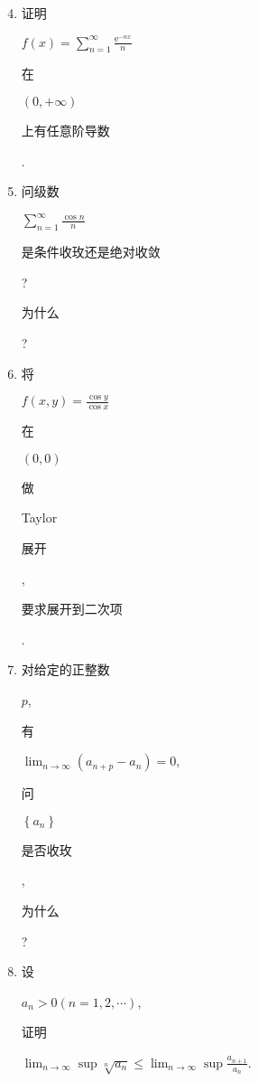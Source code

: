 \documentclass[10pt]{article}
\begin{document}
\begin{enumerate}
  \setcounter{enumi}{3}
  \item \begin{CJK}{UTF8}{mj}证明\end{CJK} $f(x)=\sum_{n=1}^{\infty} \frac{\mathrm{e}^{-n x}}{n}$ \begin{CJK}{UTF8}{mj}在\end{CJK} $(0,+\infty)$ \begin{CJK}{UTF8}{mj}上有任意阶导数\end{CJK}.

  \item \begin{CJK}{UTF8}{mj}问级数\end{CJK} $\sum_{n=1}^{\infty} \frac{\cos n}{n}$ \begin{CJK}{UTF8}{mj}是条件收玫还是绝对收敛\end{CJK}? \begin{CJK}{UTF8}{mj}为什么\end{CJK}?

  \item \begin{CJK}{UTF8}{mj}将\end{CJK} $f(x, y)=\frac{\cos y}{\cos x}$ \begin{CJK}{UTF8}{mj}在\end{CJK} $(0,0)$ \begin{CJK}{UTF8}{mj}做\end{CJK} Taylor \begin{CJK}{UTF8}{mj}展开\end{CJK}, \begin{CJK}{UTF8}{mj}要求展开到二次项\end{CJK}.

  \item \begin{CJK}{UTF8}{mj}对给定的正整数\end{CJK} $p$, \begin{CJK}{UTF8}{mj}有\end{CJK} $\lim _{n \rightarrow \infty}\left(a_{n+p}-a_{n}\right)=0$, \begin{CJK}{UTF8}{mj}问\end{CJK} $\left\{a_{n}\right\}$ \begin{CJK}{UTF8}{mj}是否收玫\end{CJK}, \begin{CJK}{UTF8}{mj}为什么\end{CJK}?

  \item \begin{CJK}{UTF8}{mj}设\end{CJK} $a_{n}>0(n=1,2, \cdots)$, \begin{CJK}{UTF8}{mj}证明\end{CJK} $\lim _{n \rightarrow \infty} \sup \sqrt[n]{a_{n}} \leq \lim _{n \rightarrow \infty} \sup \frac{a_{n+1}}{a_{n}}$.


\end{enumerate}
\end{document}
